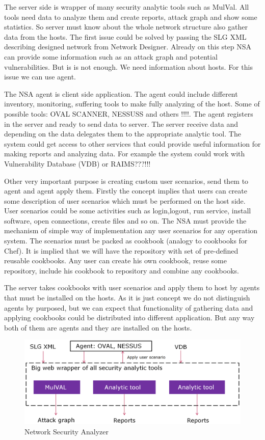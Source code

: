 \documentclass[twoside]{article}
\begin{document}
The server side is wrapper of many security analytic tools such as MulVal. All tools need data to analyze them and create reports, attack graph and show some statistics. So server must know about the whole network structure also gather data from the hosts. The first issue could be solved by passing the SLG XML describing designed network from Network Designer. Already on this step NSA can provide some information such as an attack graph and potential vulnerabilities. But is is not enough. We need information about hosts. For this issue we can use agent. 

The NSA agent is client side application. The agent could include different inventory, monitoring, suffering tools to make fully analyzing of the host. Some of possible tools: OVAL SCANNER, NESSUSS and others !!!!. The agent registers in the server and ready to send data to server. The server receive data and depending on the data delegates them to the appropriate analytic tool. The system could get access to other services that could provide useful information for making reports and analyzing data. For example the system could work with Vulnerability Database (VDB) or RAIMS???!!!

Other very important purpose is creating custom user scenarios, send them to agent and agent apply them. Firstly the concept implies that users can create some description of user scenarios which must be performed on the host side. User scenarios could be some activities such as login,logout, run service, install software, open connections, create files and so on. The NSA must provide the mechanism of simple way of implementation any user scenarios for any operation system. The scenarios must be packed as cookbook (analogy to cookbooks for Chef). It is implied that we will have the repository with set of pre-defined reusable cookbooks. Any user can create his own cookbook, reuse some repository, include his cookbook to repository and combine any cookbooks. 

The server takes cookbooks with user scenarios and apply them to host by agents that must be installed on the hosts. As it is just concept we do not distinguish agents by purposed, but we can expect that functionality of gathering data and applying cookbooks could be distributed into different application. But any way both of them are agents and they are installed on the hosts.         

\begin{figure}[ht!]
\centering
\includegraphics[width=145mm]{nsa.png}
\caption{Network Security Analyzer}
\label{overflow}
\end{figure}
\end{document}
